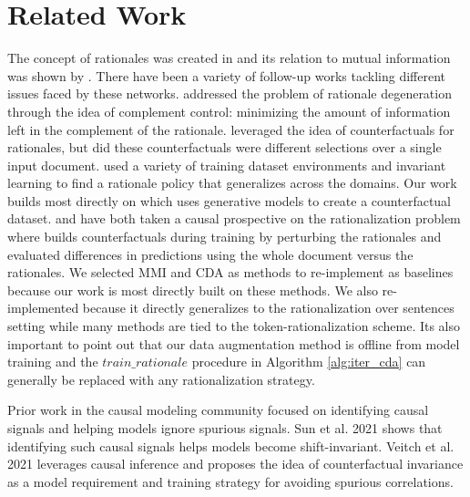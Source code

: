 \section{Related Work}
The concept of rationales was created in \cite{lei_rationalizing_2016} and its relation to mutual information was shown by \cite{chen_learning_2018}. There have been a variety of follow-up works tackling different issues faced by these networks. \citeauthor{yu_rethinking_2019} addressed the problem of rationale degeneration through the idea of complement control: minimizing the amount of information left in the complement of the rationale. \citeauthor{chang_game_2019} leveraged the idea of counterfactuals for rationales, but did these counterfactuals were different selections over a single input document. \citeauthor{chang_invariant_2020} used a variety of training dataset environments and invariant learning to find a rationale policy that generalizes across the domains. Our work builds most directly on \citeauthor{plyler_making_2021} which uses generative models to create a counterfactual dataset. \citeauthor{liu_d-separation_2023} and \citeauthor{zhang_towards_2023} have both taken a causal prospective on the rationalization problem where \cite{liu_d-separation_2023} builds counterfactuals during training by perturbing the rationales and \citeauthor{zhang_towards_2023} evaluated differences in predictions using the whole document versus the rationales. We selected MMI \cite{lei_rationalizing_2016} \cite{chen_learning_2018} and CDA \cite{plyler_making_2021} as methods to re-implement as baselines because our work is most directly built on these methods. We also re-implemented \cite{yu_rethinking_2019} because it directly generalizes to the rationalization over sentences setting while many methods are tied to the token-rationalization scheme. Its also important to point out that our data augmentation method is offline from model training and the $train\_rationale$ procedure in Algorithm \ref{alg:iter_cda} can generally be replaced with any rationalization strategy.

Prior work in the causal modeling community focused on identifying causal signals and helping models ignore spurious signals. Sun et al. 2021 shows that identifying such causal signals helps models become shift-invariant. Veitch et al. 2021 leverages causal inference and  proposes the idea of counterfactual invariance as a model requirement and training strategy for avoiding spurious correlations.

